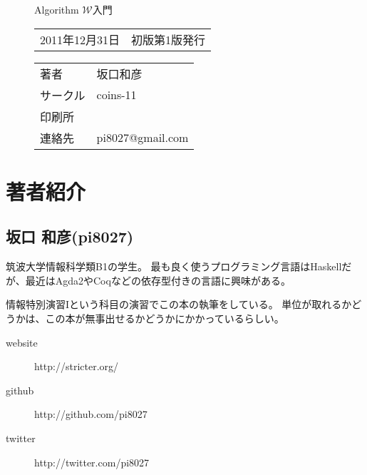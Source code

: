 \pagestyle{empty}

\begin{figure}[b]

{\LARGE Algorithm $\mathcal W$入門}

\hrulefill

\begin{tabular}{rl}
2011年12月31日 & 初版第1版発行
\end{tabular}

\vspace{1em}

\begin{tabular}{ll}
著者     & 坂口和彦 \\
サークル & coins-11 \\
印刷所   & \\
連絡先   & pi8027@gmail.com \\
\end{tabular}

\hrulefill

\end{figure}

\section*{著者紹介}

\subsection*{坂口 和彦(pi8027)}

筑波大学情報科学類B1の学生。
最も良く使うプログラミング言語はHaskellだが、最近はAgda2やCoqなどの依存型付きの言語に興味がある。

情報特別演習Iという科目の演習でこの本の執筆をしている。
単位が取れるかどうかは、この本が無事出せるかどうかにかかっているらしい。

\begin{description}
\item[website] http://stricter.org/
\item[github] http://github.com/pi8027
\item[twitter] http://twitter.com/pi8027
\end{description}


